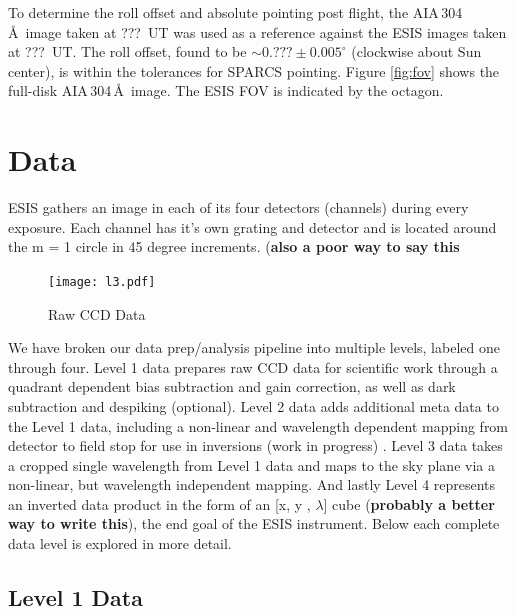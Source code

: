 		To determine the roll offset and absolute pointing post flight, the AIA\,304\,\AA\ image taken at ???~UT was used as a reference against the ESIS images taken at ???~UT.  The roll offset, found to be $\sim0.???\pm 0.005^\circ$ (clockwise about Sun center), is within the tolerances for SPARCS pointing.  Figure \ref{fig:fov} shows the full-disk AIA\,304\,\AA\ image. The ESIS FOV is indicated by the octagon.  
	
\section{Data} 

    ESIS gathers an image in each of its four detectors (channels) during every exposure.  
    Each channel has it's own grating and detector and is located around the m = 1 circle in 45 degree increments. (\textbf{also a poor way to say this}
    
    \begin{figure}[h!]
        \centering
       	\texttt{[image: l3.pdf]}
        \caption{Raw CCD Data}
        \label{fig:Level0}
    \end{figure}
    
    We have broken our data prep/analysis pipeline into multiple levels, labeled one through four.
    Level 1 data prepares raw CCD data for scientific work through a quadrant dependent bias subtraction and gain correction, as well as dark subtraction and despiking (optional).
    Level 2 data adds additional meta data to the Level 1 data, including a non-linear and wavelength dependent mapping from detector to field stop for use in inversions (work in progress)  .
    Level 3 data takes a cropped single wavelength from Level 1 data and maps to the sky plane via a non-linear, but wavelength independent mapping.
    And lastly Level 4 represents an inverted data product in the form of an [x, y , $\lambda$] cube (\textbf{probably a better way to write this}), the end goal of the ESIS instrument.
    Below each complete data level is explored in more detail.
    
    \subsection{Level 1 Data}
    

